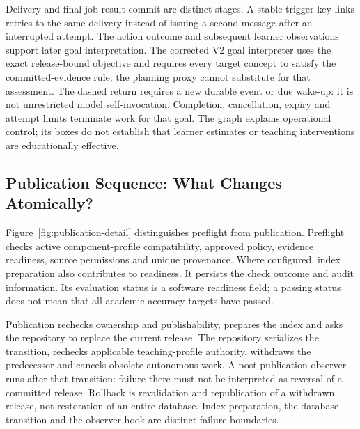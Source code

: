 Delivery and final job-result commit are distinct stages. A stable trigger key
links retries to the same delivery instead of issuing a second message after
an interrupted attempt. The action outcome and subsequent learner observations
support later goal interpretation. The corrected V2 goal interpreter uses
the exact release-bound objective and requires every target concept to satisfy
the committed-evidence rule; the planning proxy cannot substitute for that
assessment. The dashed return requires a new durable
event or due wake-up: it is not unrestricted model self-invocation. Completion,
cancellation, expiry and attempt limits terminate work for that goal. The graph
explains operational control; its boxes do not establish that learner estimates
or teaching interventions are educationally effective.

\subsection{Publication Sequence: What Changes Atomically?}
Figure~\ref{fig:publication-detail} distinguishes preflight from publication.
Preflight checks active component-profile compatibility, approved policy,
evidence readiness, source permissions and unique provenance. Where configured,
index preparation also contributes to readiness. It persists the check outcome
and audit information. Its evaluation status is a software readiness field;
a passing status does not mean that all academic accuracy targets have passed.

Publication rechecks ownership and publishability, prepares the index and asks
the repository to replace the current release. The repository serializes the
transition, rechecks applicable teaching-profile authority, withdraws the
predecessor and cancels obsolete autonomous work. A post-publication observer
runs after that transition: failure there must not be interpreted as reversal
of a committed release. Rollback is revalidation and republication of a withdrawn
release, not restoration of an entire database. Index preparation, the database
transition and the observer hook are distinct failure boundaries.

